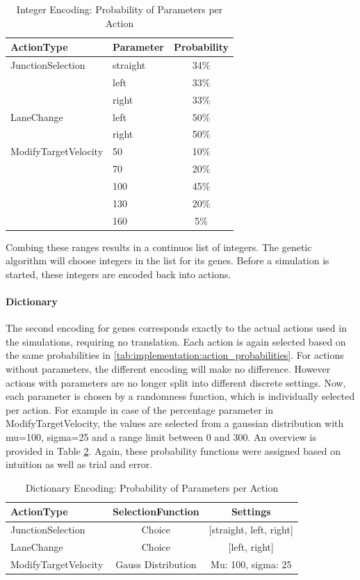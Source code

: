 \begin{table}[ht]
	\centering
	\begin{tabular}{llc}
		\hline
		ActionType & Parameter & Probability \\
		\hline
		JunctionSelection 	& straight & 34\% \\
		& left & 33\% \\
		& right & 33\% \\
		\hline
		LaneChange 			& left & 50\% \\
		& right & 50\% \\
		\hline
		ModifyTargetVelocity & 50 & 10\%\\
		& 70 & 20\%\\
		& 100 & 45\%\\
		& 130 & 20\%\\
		& 160 & 5\%\\
		\hline
	\end{tabular}
	\caption{Integer Encoding: Probability of Parameters per Action}
	\label{tab:implementation:integer_encoding_probabilities}
\end{table}

Combing these ranges results in a continuos list of integers. The genetic algorithm will choose integers in the list for its genes. Before a simulation is started, these integers are encoded back into actions.

\paragraph{Dictionary}
The second encoding for genes corresponds exactly to the actual actions used in the simulations, requiring no translation. Each action is again selected based on the same probabilities in \ref{tab:implementation:action_probabilities}. For actions without parameters, the different encoding will make no difference. However actions with parameters are no longer split into different discrete settings. Now, each parameter is chosen by a randomness function, which is individually selected per action. For example in case of the percentage parameter in ModifyTargetVelocity, the values are selected from a gaussian distribution with mu=100, sigma=25 and a range limit between 0 and 300. An overview is provided in Table \ref{tab:implementation:dict_encoding_probabilities}.
Again, these probability functions were assigned based on intuition as well as trial and error. 

\begin{table}[ht]
	\centering
	\begin{tabular}{lcc}
		\hline
		ActionType & SelectionFunction & Settings \\
		\hline
		JunctionSelection 	& Choice & [straight, left, right] \\
		LaneChange 			& Choice & [left, right]\\
		ModifyTargetVelocity & Gauss Distribution & Mu: 100, sigma: 25\\
		\hline
	\end{tabular}
	\caption{Dictionary Encoding: Probability of Parameters per Action}
	\label{tab:implementation:dict_encoding_probabilities}
\end{table}

